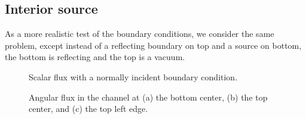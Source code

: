 \subsection{Interior source}

As a more realistic test of the boundary conditions, we consider the same
problem, except instead of a reflecting boundary on top and a source on bottom,
the bottom is reflecting and the top is a vacuum.

\begin{figure}[tb]
  \centering
  \hspace{-.5in}
  
  \hspace{-.5in}
  \caption{Scalar flux with a normally incident boundary condition.}
  \label{fig:bcReactorFlux}
\end{figure}

\begin{figure}[htb]
  \centering\small

  \hspace{-.75in}
  \hspace{-.5in}%
  \hspace{-.75in}
  \caption{Angular flux in the channel at (a) the bottom center, (b) the top
  center, and (c) the top left edge.}
  \label{fig:bcReactor}
\end{figure}

